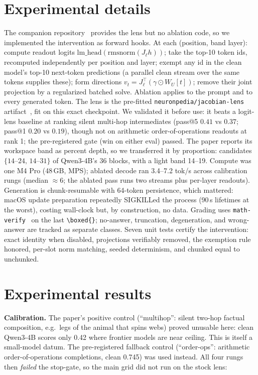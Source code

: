 \documentclass[11pt]{article}
\begin{document}
\section{Experimental details}
The companion repository~\cite{jlens} provides the lens but no ablation code, so we implemented the
intervention as forward hooks. At each (position, band layer): compute readout logits
$\mathrm{lm\_head}(\mathrm{rmsnorm}(J_\ell h))$; take the top-10 token ids, recomputed
independently per position and layer; exempt any id in the clean model's top-10
next-token predictions (a parallel clean stream over the same tokens supplies these);
form directions $v_t=J_\ell^{\top}(\gamma\odot W_U[t])$; remove their joint projection
by a regularized batched solve. Ablation applies to the prompt and to every generated
token. The lens is the pre-fitted \texttt{neuronpedia/jacobian-lens} artifact~\cite{neuronpedia}, fit on
this exact checkpoint. We validated it before use: it beats a logit-lens baseline at
ranking silent multi-hop intermediates (pass@5 $0.41$ vs $0.37$; pass@1 $0.20$ vs
$0.19$), though not on arithmetic order-of-operations readouts at rank 1; the
pre-registered gate (win on either eval) passed. The paper reports its workspace band
as percent depth, so we transferred it by proportion: candidates
$\{14\text{--}24,\,14\text{--}31\}$ of Qwen3-4B's 36 blocks, with a light band
14--19. Compute was one M4 Pro (48\,GB, MPS); ablated decode ran 3.4--7.2 tok/s across
calibration rungs (median ${\approx}6$; the ablated pass runs two streams plus
per-layer readouts). Generation is chunk-resumable with 64-token persistence, which
mattered: macOS update preparation repeatedly SIGKILLed the process (90\,s lifetimes at
the worst), costing wall-clock but, by construction, no data. Grading uses
\texttt{math-verify}~\cite{mathverify} on the last \verb|\boxed{}|; no-answer, truncation, degeneration,
and wrong-answer are tracked as separate classes. Seven unit tests certify the
intervention: exact identity when disabled, projections verifiably removed, the
exemption rule honored, per-slot norm matching, seeded determinism, and chunked equal
to unchunked.

\section{Experimental results}
\textbf{Calibration.} The paper's positive control (``multihop'': silent two-hop
factual composition, e.g.\ legs of the animal that spins webs) proved unusable here:
clean Qwen3-4B scores only 0.42 where frontier models are near ceiling. This is itself
a small-model datum. The pre-registered fallback control (``order-ops'': arithmetic
order-of-operations completions, clean 0.745) was used instead. All four rungs then
\emph{failed} the stop-gate, so the main grid did not run on the stock lens:
\end{document}
